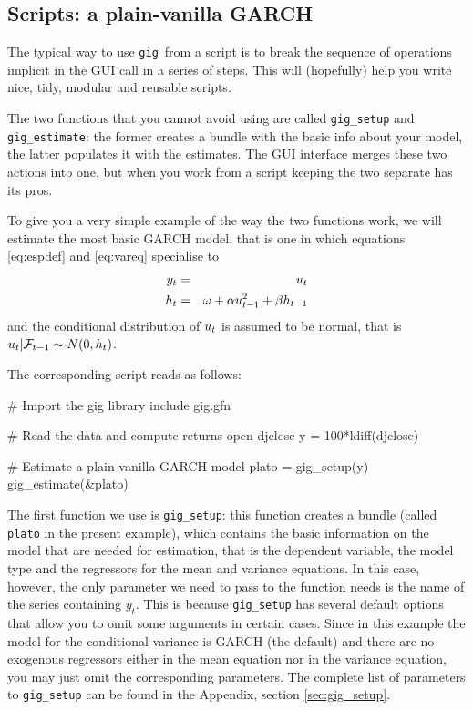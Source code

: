 \documentclass[a4paper,11pt]{article}
\newcounter{script}[section]
\newcommand{\uhat}{\ensuremath u}
\newcommand{\InfSet}[1]{\ensuremath \mathcal{F}_{#1}}
\newcommand{\gig}{\texttt{gig}}
\begin{document}


\subsection{Scripts: a plain-vanilla GARCH}
\label{sec:plain-garch}

The typical way to use \gig\ from a script is to break the sequence of
operations implicit in the GUI call in a series of steps. This will
(hopefully) help you write nice, tidy, modular and reusable scripts.

The two functions that you cannot avoid using are called
\texttt{gig\_setup} and \texttt{gig\_estimate}: the former creates a
bundle with the basic info about your model, the latter populates it
with the estimates. The GUI interface merges these two actions into
one, but when you work from a script keeping the two separate has its
pros.

To give you a very simple example of the way the two functions work,
we will estimate the most basic GARCH model, that is one in which
equations \eqref{eq:espdef} and \eqref{eq:vareq} specialise to
\begin{eqnarray*}
  y_t & = & \uhat_{t} \\
  h_t & = & \omega + \alpha \uhat_{t-1}^2 + \beta h_{t-1}
\end{eqnarray*}
and the conditional distribution of $\uhat_{t}$ is assumed to be
normal, that is $\uhat_{t} | \InfSet{t-1} \sim N(0, h_t)$.

The corresponding script reads as follows:
\begin{code}
# Import the gig library
include gig.gfn

# Read the data and compute returns
open djclose
y = 100*ldiff(djclose)

# Estimate a plain-vanilla GARCH model
plato = gig_setup(y)
gig_estimate(&plato)
\end{code}

The first function we use is \texttt{gig\_setup}: this function
creates a bundle (called \texttt{plato} in the present example), which
contains the basic information on the model that are needed for
estimation, that is the dependent variable, the model type and the
regressors for the mean and variance equations. In this case, however,
the only parameter we need to pass to the function needs is the name
of the series containing $y_t$. This is because \texttt{gig\_setup}
has several default options that allow you to omit some arguments in
certain cases. Since in this example the model for the conditional
variance is GARCH (the default) and there are no exogenous regressors
either in the mean equation nor in the variance equation, you may just
omit the corresponding parameters. The complete list of parameters to
\texttt{gig\_setup} can be found in the Appendix, section
\ref{sec:gig_setup}.
\end{document}

